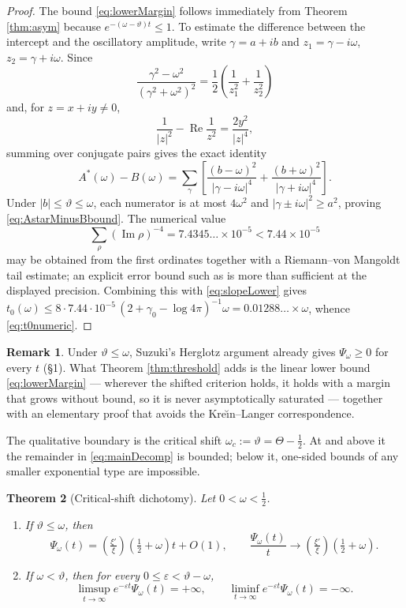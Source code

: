 \documentclass[11pt,reqno]{amsart}
\theoremstyle{plain}
\newtheorem{theorem}{Theorem}[section]
\theoremstyle{definition}
\newtheorem{remark}[theorem]{Remark}
\newcommand{\Rp}{\operatorname{Re}}
\newcommand{\Ip}{\operatorname{Im}}
\newcommand{\lxi}[1]{\left(\tfrac{\xi'}{\xi}\right)\!#1}
\begin{document}
\begin{proof}
The bound \eqref{eq:lowerMargin} follows immediately from Theorem \ref{thm:asym} because
$e^{-(\omega-\vartheta)t}\le1$.  To estimate the difference between the intercept and the
oscillatory amplitude, write $\gamma=a+ib$ and $z_1=\gamma-i\omega$, $z_2=\gamma+i\omega$.
Since
\[
 \frac{\gamma^2-\omega^2}{(\gamma^2+\omega^2)^2}
 =\frac12\left(\frac1{z_1^2}+\frac1{z_2^2}\right)
\]
and, for $z=x+iy\ne0$,
\[
 \frac1{|z|^2}-\Rp\frac1{z^2}=\frac{2y^2}{|z|^4},
\]
summing over conjugate pairs gives the exact identity
\begin{equation}\label{eq:AstarminusB}
 A^*(\omega)-B(\omega)
 =\sum_\gamma\left[
 \frac{(b-\omega)^2}{|\gamma-i\omega|^4}
 +\frac{(b+\omega)^2}{|\gamma+i\omega|^4}
 \right].
\end{equation}
Under $|b|\le\vartheta\le\omega$, each numerator is at most $4\omega^2$ and
$|\gamma\pm i\omega|^2\ge a^2$, proving \eqref{eq:AstarMinusBbound}.  The numerical value
\[
 \sum_\rho(\Ip\rho)^{-4}=7.4345\ldots\times10^{-5}<7.44\times10^{-5}
\]
may be obtained from the first ordinates together with a Riemann--von Mangoldt tail estimate; an
explicit error bound such as \cite{TrudgianArg} is more than sufficient at the displayed precision.
Combining this with \eqref{eq:slopeLower} gives
$t_0(\omega)\le 8\cdot7.44\cdot10^{-5}\,(2+\gamma_0-\log4\pi)^{-1}\omega=0.01288\ldots\times\omega$,
whence \eqref{eq:t0numeric}.
\end{proof}

\begin{remark}
Under $\vartheta\le\omega$, Suzuki's Herglotz argument already gives $\Psi_\omega\ge0$ for every
$t$ (\S1).  What Theorem \ref{thm:threshold} adds is the linear lower bound
\eqref{eq:lowerMargin} --- wherever the shifted criterion holds, it holds with a margin that grows
without bound, so it is never asymptotically saturated --- together with an elementary proof that
avoids the Kre\u\i n--Langer correspondence.
\end{remark}

The qualitative boundary is the critical shift $\omega_c:=\vartheta=\Theta-\tfrac12$.
At and above it the remainder in \eqref{eq:mainDecomp} is bounded; below it, one-sided bounds of any
smaller exponential type are impossible.

\begin{theorem}[Critical-shift dichotomy]\label{thm:transition}
Let $0<\omega<\tfrac12$.
\begin{enumerate}
\item[(i)] If $\vartheta\le\omega$, then
\[
 \Psi_\omega(t)=\lxi{\left(\tfrac12+\omega\right)}t+O(1),
 \qquad
 \frac{\Psi_\omega(t)}t\longrightarrow
 \lxi{\left(\tfrac12+\omega\right)}.
\]
\item[(ii)] If $\omega<\vartheta$, then for every $0\le\varepsilon<\vartheta-\omega$,
\[
 \limsup_{t\to\infty}e^{-\varepsilon t}\Psi_\omega(t)=+\infty,
 \qquad
 \liminf_{t\to\infty}e^{-\varepsilon t}\Psi_\omega(t)=-\infty.
\]
\end{enumerate}
\end{theorem}
\end{document}
